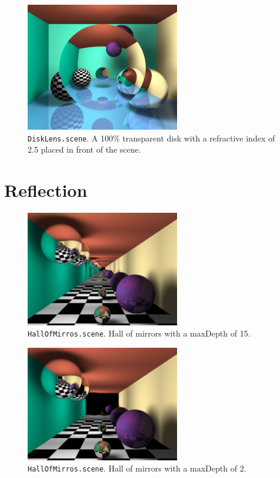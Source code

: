 \documentclass{article}
\begin{document}
\begin{figure}[H]
    \centering
    \includegraphics[width=0.6\textwidth]{./examples/DiskLens.png}
    \caption{\texttt{DiskLens.scene}. A 100\% transparent disk with a refractive index of 2.5 placed in front of the scene.}
\end{figure}

\section{Reflection}

\begin{figure}[H]
    \centering
    \includegraphics[width=0.6\textwidth]{./examples/HallOfMirrors.png}
    \caption{\texttt{HallOfMirros.scene}. Hall of mirrors with a maxDepth of 15.}
\end{figure}

\begin{figure}[H]
    \centering
    \includegraphics[width=0.6\textwidth]{./examples/HallOfMirrorsDepth2.png}
    \caption{\texttt{HallOfMirros.scene}. Hall of mirrors with a maxDepth of 2.}
\end{figure}
\end{document}
